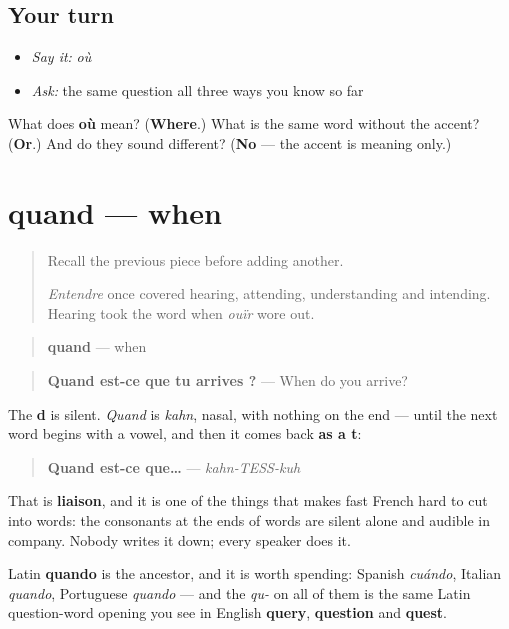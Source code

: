 \subsection*{Your turn}
\begin{itemize}
\raggedright
  \item \emph{Say it:} \emph{où}
  \item \emph{Ask:} the same question all three ways you know so far
\end{itemize}

\begin{tcolorbox}[breakable,colback=teal!4,colframe=teal!35!black,title={Before you move on}]
What does \textbf{où} mean? (\textbf{Where}.) What is the same word without the accent? (\textbf{Or}.) And do they sound different? (\textbf{No} — the accent is meaning only.)
\end{tcolorbox}
\section[quand]{quand — when}

\label{lesson:FR-C32-quand}



\begin{quote}
Recall the previous piece before adding another.

\emph{Entendre} once covered hearing, attending, understanding and intending. Hearing took the word when \emph{ouïr} wore out.
\end{quote}

\begin{cousinweb}
\begin{quote}
\textbf{quand} — when
\end{quote}

\begin{quote}
\textbf{Quand est-ce que tu arrives ?} — When do you arrive?
\end{quote}

The \textbf{d} is silent. \emph{Quand} is \emph{kahn}, nasal, with nothing on the end — until the next word begins with a vowel, and then it comes back \textbf{as a t}:

\begin{quote}
\textbf{Quand est-ce que…} — \emph{kahn-TESS-kuh}
\end{quote}

That is \textbf{liaison}, and it is one of the things that makes fast French hard to cut into words: the consonants at the ends of words are silent alone and audible in company. Nobody writes it down; every speaker does it.

Latin \textbf{quando} is the ancestor, and it is worth spending: Spanish \emph{cuándo}, Italian \emph{quando}, Portuguese \emph{quando} — and the \emph{qu-} on all of them is the same Latin question-word opening you see in English \textbf{query}, \textbf{question} and \textbf{quest}.
\end{cousinweb}

